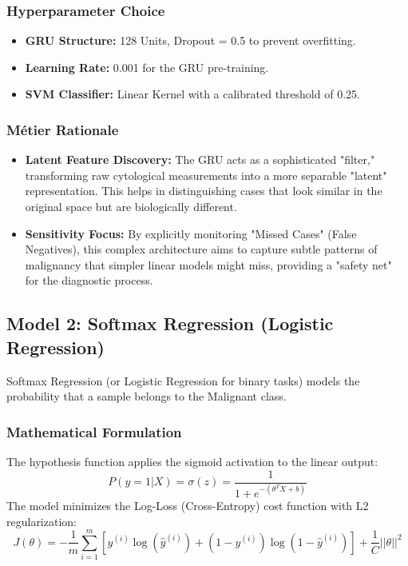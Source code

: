 \subsubsection{Hyperparameter Choice}
\begin{itemize}
    \item \textbf{GRU Structure:} 128 Units, Dropout = 0.5 to prevent overfitting.
    \item \textbf{Learning Rate:} 0.001 for the GRU pre-training.
    \item \textbf{SVM Classifier:} Linear Kernel with a calibrated threshold of 0.25.
\end{itemize}

\subsubsection{Métier Rationale}
\begin{itemize}
    \item \textbf{Latent Feature Discovery:} The GRU acts as a sophisticated "filter," transforming raw cytological measurements into a more separable "latent" representation. This helps in distinguishing cases that look similar in the original space but are biologically different.
    \item \textbf{Sensitivity Focus:} By explicitly monitoring "Missed Cases" (False Negatives), this complex architecture aims to capture subtle patterns of malignancy that simpler linear models might miss, providing a "safety net" for the diagnostic process.
\end{itemize}

\subsection{Model 2: Softmax Regression (Logistic Regression)}
Softmax Regression (or Logistic Regression for binary tasks) models the probability that a sample belongs to the Malignant class.

\subsubsection{Mathematical Formulation}
The hypothesis function applies the sigmoid activation to the linear output:
\begin{equation}
    P(y=1|X) = \sigma(z) = \frac{1}{1 + e^{-(\theta^T X + b)}}
\end{equation}
The model minimizes the Log-Loss (Cross-Entropy) cost function with L2 regularization:
\begin{equation}
    J(\theta) = - \frac{1}{m} \sum_{i=1}^{m} [y^{(i)}\log(\hat{y}^{(i)}) + (1-y^{(i)})\log(1-\hat{y}^{(i)})] + \frac{1}{C} ||\theta||^2
\end{equation}

